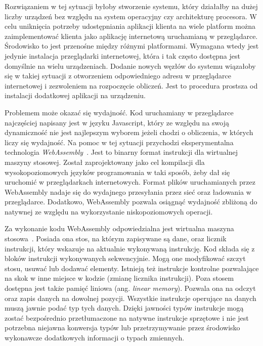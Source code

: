 \documentclass[a4paper,11pt,twoside]{report}
\theoremstyle{definition}
\begin{document}
    Rozwiązaniem w tej sytuacji byłoby stworzenie systemu, który działałby na dużej liczby urządzeń
    bez względu na system operacyjny czy architekturę procesora.
    W celu uniknięcia potrzeby udostępniania aplikacji klienta na wiele platform można zaimplementować
    klienta jako aplikację internetową uruchamianą w przeglądarce. Środowisko to jest przenośne
    między różnymi platformami. Wymagana wtedy jest jedynie instalacja przeglądarki internetowej,
    która i tak często dostępna jest domyślnie na wielu urządzeniach.
    Dodanie nowych węzłów do systemu wiązałoby się w takiej sytuacji z otworzeniem odpowiedniego
    adresu w przeglądarce internetowej i zezwoleniem na rozpoczęcie obliczeń.
    Jest to procedura prostsza od instalacji dodatkowej aplikacji na urządzeniu.
    
    Problemem może okazać się wydajność. Kod uruchamiany w przeglądarce najczęściej napisany
    jest w języku {Javascript}, który ze względu na swoją dynamiczność nie jest najlepszym wyborem
    jeżeli chodzi o obliczenia, w których liczy się wydajność. Na pomoc w tej sytuacji przychodzi
    eksperymentalna technologia \textit{WebAssembly}~\cite{webassembly-goals}.
    Jest to binarny format instrukcji dla wirtualnej maszyny stosowej.
    Został zaprojektowany jako cel kompilacji dla wysokopoziomowych języków programowania
    w taki sposób, żeby dał się uruchomić w przeglądarkach internetowych.
    Format plików uruchamianych przez WebAssembly nadaje się do wydajnego przesyłania przez sieć
    oraz ładowania w przeglądarce.
    Dodatkowo, WebAssembly pozwala osiągnąć wydajność zbliżoną do natywnej ze względu na wykorzystanie
    niskopoziomowych operacji.
    
    Za wykonanie kodu WebAssembly odpowiedzialna jest wirtualna maszyna stosowa~\cite{webassembly-semantics}.
    Posiada ona stos, na którym zapisywane są dane, oraz licznik instrukcji, który wskazuje
    na aktualnie wykonywaną instrukcję.
    Kod składa się z bloków instrukcji wykonywanych sekwencyjnie.
    Mogą one modyfikować szczyt stosu, usuwać lub dodawać elementy.
    Istnieją też instrukcje kontrolne pozwalające na skok w inne miejsce w kodzie (zmianę licznika instrukcji).
    Poza stosem dostępna jest także pamięć liniowa (ang. \textit{linear memory}).
    Pozwala ona na odczyt oraz zapis danych na dowolnej pozycji.
    Wszystkie instrukcje operujące na danych muszą jawnie podać typ tych danych.
    Dzięki jawności typów instrukcje mogą zostać bezpośrednio przetłumaczone na natywne instrukcje
    sprzętowe
    i nie jest potrzebna niejawna konwersja typów lub przetrzymywanie przez środowisko wykonawcze
    dodatkowych informacji o typach zmiennych.
    
\end{document}
